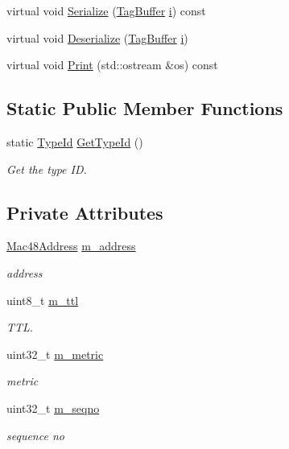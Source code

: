 \begin{DoxyCompactItemize}
\item 
virtual void \hyperlink{classns3_1_1dot11s_1_1HwmpTag_abefebf292cb02dc8c5905d684b40e0eb}{Serialize} (\hyperlink{classns3_1_1TagBuffer}{Tag\+Buffer} \hyperlink{lte__uplink__power__control_8m_a6f6ccfcf58b31cb6412107d9d5281426}{i}) const 
\item 
virtual void \hyperlink{classns3_1_1dot11s_1_1HwmpTag_a51ba86c985a4be8985f8cfaf4a531ca2}{Deserialize} (\hyperlink{classns3_1_1TagBuffer}{Tag\+Buffer} \hyperlink{lte__uplink__power__control_8m_a6f6ccfcf58b31cb6412107d9d5281426}{i})
\item 
virtual void \hyperlink{classns3_1_1dot11s_1_1HwmpTag_adf13ac2c4e0a7e7b8631ca915a1de087}{Print} (std\+::ostream \&os) const 
\end{DoxyCompactItemize}
\subsection*{Static Public Member Functions}
\begin{DoxyCompactItemize}
\item 
static \hyperlink{classns3_1_1TypeId}{Type\+Id} \hyperlink{classns3_1_1dot11s_1_1HwmpTag_a500cc466f120ae3573f3a9887639182f}{Get\+Type\+Id} ()
\begin{DoxyCompactList}\small\item\em Get the type ID. \end{DoxyCompactList}\end{DoxyCompactItemize}
\subsection*{Private Attributes}
\begin{DoxyCompactItemize}
\item 
\hyperlink{classns3_1_1Mac48Address}{Mac48\+Address} \hyperlink{classns3_1_1dot11s_1_1HwmpTag_a9876adf8a7fa6f2a0c2b9cef420e6c51}{m\+\_\+address}
\begin{DoxyCompactList}\small\item\em address \end{DoxyCompactList}\item 
uint8\+\_\+t \hyperlink{classns3_1_1dot11s_1_1HwmpTag_a998c4149463609ac797f3d9bfc11daf0}{m\+\_\+ttl}
\begin{DoxyCompactList}\small\item\em T\+TL. \end{DoxyCompactList}\item 
uint32\+\_\+t \hyperlink{classns3_1_1dot11s_1_1HwmpTag_aa55f54e47fb39aa917a29552620f8dbe}{m\+\_\+metric}
\begin{DoxyCompactList}\small\item\em metric \end{DoxyCompactList}\item 
uint32\+\_\+t \hyperlink{classns3_1_1dot11s_1_1HwmpTag_ae15e0ad85f6f8e437e285a2d2fee66f1}{m\+\_\+seqno}
\begin{DoxyCompactList}\small\item\em sequence no \end{DoxyCompactList}\end{DoxyCompactItemize}
